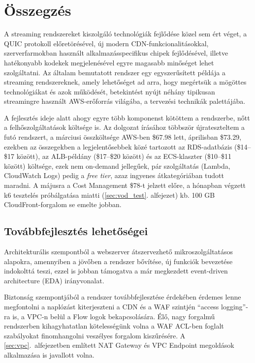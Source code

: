 \chapter{Összegzés}

A streaming rendszereket kiszolgáló technológiák fejlődése közel sem ért véget, a QUIC protokoll előretörésével, új modern CDN-funkcionalitásokkal, szerverfarmokban használt alkalmazásspecifikus chipek fejlődésével, illetve hatékonyabb kodekek megjelenésével egyre magasabb minőséget lehet szolgáltatni. Az általam bemutatott rendszer egy egyszerűsített példája a streaming rendszereknek, amely lehetőséget ad arra, hogy megértsük a mögöttes technológiákat és azok működését, betekintést nyújt néhány tipikusan streamingre használt AWS-erőforrás világába, a tervezési technikák palettájába.

A fejlesztés ideje alatt ahogy egyre több komponenst kötöttem a rendszerbe, nőtt a felhőszolgáltatások költsége is. Az dolgozat írásához többször újrateszteltem a futó rendszert, a márciusi összköltsége AWS-ben \$67.98 lett, áprilisban \$73.29, ezekben az összegekben a legjelentősebbek közé tartozott az RDS-adatbázis (\$14--\$17 között), az ALB-példány (\$17--\$20 között) és az ECS-klaszter (\$10--\$11 között) költsége, ezek nem on-demand jellegűek, pár szolgáltatás (Lambda, CloudWatch Logs) pedig a \emph{free tier}, azaz ingyenes átkategóriában tudott maradni. A májusra a Cost Management \$78-t jelzett előre, a hónapban végzett k6 tesztelés próbálgatása miatti (\ref{sec:vod_test}. alfejezet) kb. 100 GB CloudFront-forgalom se emelte jobban.

\section{Továbbfejlesztés lehetőségei}

Architekturális szempontból a webszerver átszervezhető mikroszolgáltatásos alapokra, amennyiben a jövőben a rendszer bővítése, új funkciók bevezetése indokolttá teszi, ezzel is jobban támogatva a már megkezdett event-driven architecture (EDA)\cite{eda} irányvonalat.

Biztonság szempontjából a rendszer továbbfejlesztése érdekében érdemes lenne megfontolni a naplózást kiterjeszteni a CDN és a WAF szintjén ``access logging''-ra is, a VPC-n belül a Flow logok bekapcsolására. Élő, nagy forgalmű rendszerben kihagyhatatlan kötelességünk volna a WAF ACL-ben foglalt szabályokat finomhangolni veszélyes forgalom kiszűrésére. A \ref{sec:vpc}.~alfejezetben említett NAT Gateway és VPC Endpoint megoldások alkalmazása is javallott volna.

